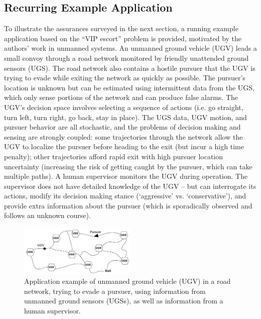 \subsection{Recurring Example Application} \label{sec:mot_example}
    To illustrate the assurances surveyed in the next section, a running example application based on the ``VIP escort'' problem \cite{Humphrey2012-lr} is provided, motivated by the authors' work in unmanned systems. 
    An unmanned ground vehicle (UGV) leads a small convoy through a road network monitored by friendly unattended ground sensors (UGS). The road network also contains a hostile pursuer that the UGV is trying to evade while exiting the network as quickly as possible. 
    The pursuer's location is unknown but can be estimated using intermittent data from the UGS, which only sense portions of the network and can produce false alarms. The UGV's decision space involves selecting a sequence of actions (i.e. go straight, turn left, turn right, go back, stay in place). The UGS data, UGV motion, and pursuer behavior are all stochastic, and the problems of decision making and sensing are strongly coupled: some trajectories through the network allow the UGV to localize the pursuer before heading to the exit (but incur a high time penalty); other trajectories afford rapid exit with high pursuer location uncertainty (increasing the risk of getting caught by the pursuer, which can take multiple paths). 
    A human supervisor monitors the UGV during operation. 
    The supervisor does not have detailed knowledge of the UGV -- but can interrogate its actions, modify its decision making stance (`aggressive' vs. `conservative'), and provide extra information about the pursuer (which is sporadically observed and follows an unknown course). %
    
	\begin{figure}[t]%
    	\centering
     	\includegraphics[width=0.5\textwidth]{Figures/RoadNet}
    	\caption{Application example of unmanned ground vehicle (UGV) in a road network, trying to evade a pursuer, using information from unmanned ground sensors (UGSs), as well as information from a human supervisor.} %
        \label{fig:RoadNet}
    \end{figure}

